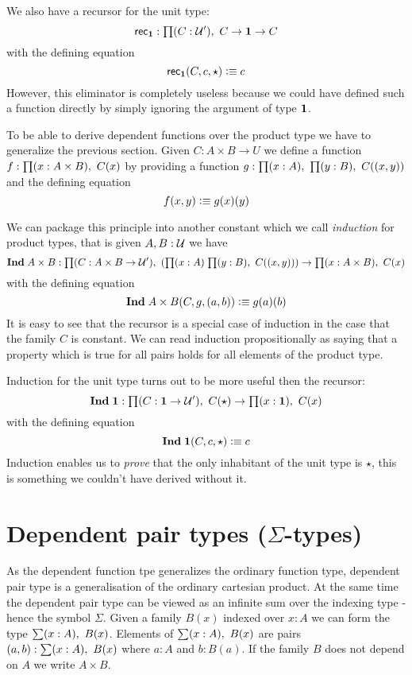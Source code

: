 We also have a recursor for the unit type:
\[\rec{\unit} : \prd{C:\UU'}C \to \unit \to C\]
with the defining equation
\[ \mathsf{rec}_{\mathbf{1}}(C,c,\star) \vcentcolon\equiv c \]
However, this eliminator is completely useless
because we could have defined such a function directly
by simply ignoring the argument of type $\mathbf{1}$.

To be able to derive dependent functions over the product type we have
to generalize the previous section. Given $C: A \times B \to U$ we
define a function $f : \prd{x : A \times B} C(x)$ by providing a
function $g : \prd{x:A}\prd{y:B} C(\tup{x}{y})$ and the defining equation
\[ f(x,y) \vcentcolon\equiv g(x)(y) \]

We can package this principle into another constant which we call
\emph{induction} for product types, that is given $A,B : \mathcal{U}$ we have
\[ \ind{A\times B} : \prd{C:A \times B \to \UU'} (\prd{x:A}{y:B}
C(\tup{x}{y})) \to \prd{x:A \times B} C(x) \]
with the defining equation 
\[ \mathbf{Ind \;}{A\times B}(C,g,( a,b)) \vcentcolon\equiv g(a)(b) \]
It is easy to see that the recursor is a special case of induction
in the case that the family $C$ is constant.
We can read induction propositionally as saying that a property which
is true for all pairs holds for all elements of the product type.

Induction for the unit type turns out to be more useful then the
recursor: 
\[ \ind{\unit} : \prd{C:\unit \to \UU'} C(\star) \to \prd{x:\unit}C(x)\]
with the defining equation
\[ \mathbf{Ind \;}{\mathbf{1}}(C,c,\star) \vcentcolon\equiv c \]
Induction enables us to \emph{prove} that the only inhabitant of the
unit type is $\star$, this is something we couldn't have derived
without it.



\section{Dependent pair types (\texorpdfstring{$\Sigma$}{Σ}-types)}
\label{sec:sigma-types}

As the dependent function tpe generalizes the ordinary function type, dependent pair type is a
generalisation of the ordinary cartesian product. At the same time 
the dependent pair type can be viewed as an infinite sum over the
indexing type - hence  the symbol $\Sigma$. Given a family $B(x)$
indexed over $x:A$ we can form the type $\sm{x:A}B(x)$. Elements of $\sm{x:A}B(x)$ are
pairs $\tup{a}{b} : \sm{x:A}B(x)$ where $a:A$ and $b:B(a)$. If the
family $B$ does not depend on $A$ we write $A \times B$.

